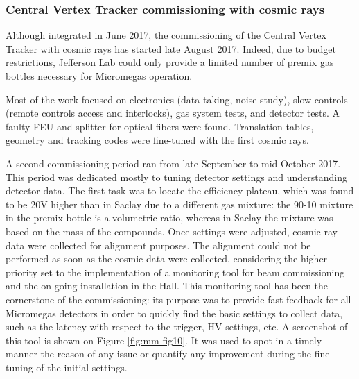 \subsubsection{Central Vertex Tracker commissioning with cosmic rays}

Although integrated in June 2017, the commissioning of the Central Vertex Tracker with cosmic rays has started late 
August 2017. Indeed, due to budget restrictions, Jefferson Lab could only provide a limited number of premix gas 
bottles necessary for Micromegas operation. 

Most of the work focused on electronics (data taking, noise study), slow controls (remote controls access and 
interlocks), gas system tests, and detector tests. A faulty FEU and splitter for optical fibers were found. Translation 
tables, geometry and tracking codes were fine-tuned with the first cosmic rays. 

A second commissioning period ran from late September to mid-October 2017. This period was dedicated mostly to tuning 
detector settings and understanding detector data. The first task was to locate the efficiency plateau, which was found 
to be 20V higher than in Saclay due to a different gas mixture: the 90-10 mixture in the premix bottle is a volumetric 
ratio, whereas in Saclay the mixture was based on the mass of the compounds. Once settings were adjusted, cosmic-ray 
data were collected for alignment purposes. The alignment could not be performed as soon as the cosmic data were 
collected, considering the higher priority set to the implementation of a monitoring tool for beam commissioning and 
the on-going installation in the Hall. This monitoring tool has been the cornerstone of the commissioning: its purpose 
was to provide fast feedback for all Micromegas detectors in order to quickly find the basic settings to collect data, 
such as the latency with respect to the trigger, HV settings, etc. A screenshot of this tool is shown on Figure 
\ref{fig:mm-fig10}. It was used to spot in a timely manner the reason of any issue or quantify any improvement during 
the fine-tuning of the initial settings.

